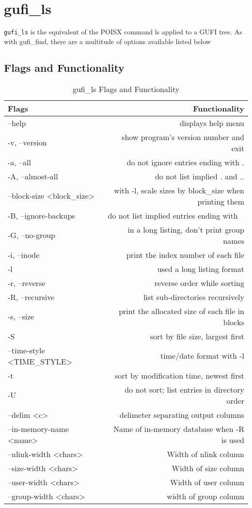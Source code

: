 \section{gufi\_ls}
\texttt{gufi\_ls} is the equivalent of the POISX command ls applied to a GUFI tree. As with gufi\_find, there are a multitude of options available listed below

\subsection{Flags and Functionality}
\begin{table} [h]
\centering
\begin{tabular}{l|r}
Flags & Functionality\\\hline
--help & displays help menu\\
-v, --version & show program's version number and exit \\
-a, --all & do not ignore entries ending with .\\
-A, --almost-all & do not list implied . and .. \\
--block-size \textless block\_size\textgreater & with -l, scale sizes by block\_size when printing them \\
-B, --ignore-backups & do not list implied entries ending with ~\\
-G, --no-group & in a long listing, don't print group names\\
-i, --inode & print the index number of each file\\
-l & used a long listing format\\
-r, --reverse & reverse order while sorting\\
-R, --recursive & list sub-directories recursively\\
-s, --size & print the allocated size of each file in blocks\\
-S & sort by file size, largest first \\
--time-style \textless TIME\_STYLE\textgreater & time/date format with -l\\
-t & sort by modification time, newest first\\
-U & do not sort; list entries in directory order\\
--delim \textless c\textgreater & delimeter separating output columns\\
--in-memory-name \textless name\textgreater & Name of in-memory database when -R is used\\
--nlink-width \textless chars\textgreater & Width of nlink column\\
--size-width \textless chars\textgreater & Width of size column\\
--user-width \textless chars\textgreater & Width of user column\\
--group-width \textless chars\textgreater & width of group column
\end{tabular}
\caption{\label{fig:gufi_ls flags}{gufi\_ls Flags and Functionality}}
\end{table}
